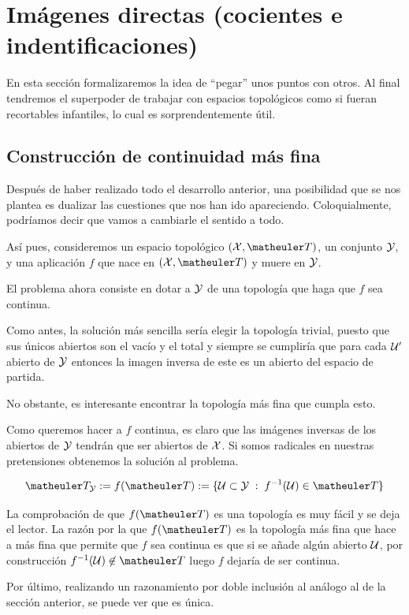 \section{Imágenes directas (cocientes e indentificaciones)}
En esta sección formalizaremos la idea de ``pegar'' unos puntos con otros. Al final tendremos el superpoder de trabajar con espacios topológicos como si fueran recortables infantiles, lo cual es sorprendentemente útil.
\subsection{Construcción de continuidad más fina}
Después de haber realizado todo el desarrollo anterior, una posibilidad que se nos plantea es dualizar las cuestiones que nos han ido apareciendo. Coloquialmente, podríamos decir que vamos a cambiarle el sentido a todo.

Así pues, consideremos un espacio topológico $(\X,\T)$, un conjunto $\mathcal{Y}$, y una aplicación $f$ que nace en $(\X,\T)$ y muere en $\mathcal{Y}$.

El problema ahora consiste en dotar a $\mathcal{Y}$ de una topología que haga que $f$ sea continua.

\begin{obs}
	Como antes, la solución más sencilla sería elegir la topología trivial, puesto que sus únicos abiertos son el vacío y el total y siempre se cumpliría que para cada $\mathcal{U}'$ abierto de $\mathcal{Y}$ entonces la imagen inversa de este es un abierto del espacio de partida.
\end{obs}

No obstante, es interesante encontrar la topología más fina que cumpla esto.

Como queremos hacer a $f$ continua, es claro que las imágenes inversas de los abiertos de $\mathcal{Y}$ tendrán que ser abiertos de $\mathcal{X}$. Si somos radicales en nuestras pretensiones obtenemos la solución al problema.

\[\T_\Y:=f(\T):=\{\U\subset \Y\midc f^{-1}(\U)\in \T\}\]

La comprobación de que $f(\T)$ es una topología es muy fácil y se deja el lector. La razón por la que $f(\T)$ es la topología más fina que hace a más fina que permite que $f$ sea continua es que si se añade algún abierto $\mathcal{U}$, por construcción $f^{-1}(\U)\not\in\T$ luego $f$ dejaría de ser continua.

Por último, realizando un razonamiento por doble inclusión al análogo al de la sección anterior, se puede ver que es única.

